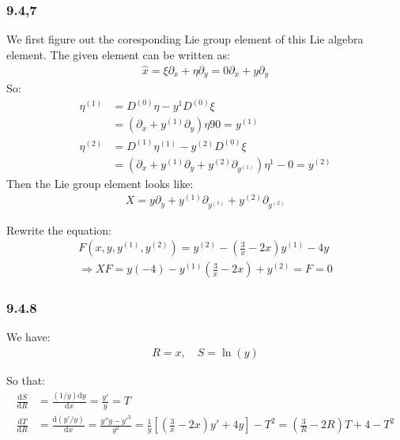 \documentclass[]{ctexart}
\newcommand{\di}{\mathrm{d}}
\newcommand{\pa}{\partial}
\begin{document}
	\subsubsection*{9.4,7}
		We first figure out the coresponding Lie group element of this Lie algebra element. The given element can be written as:
			\begin{equation*}
			\begin{aligned}
				\hat{x}=\xi\pa_x+\eta \pa_y=0\pa_x+y\pa_y
			\end{aligned}
			\end{equation*}
		So:
			\begin{equation*}
			\begin{aligned}
				\eta^{(1)}&=D^{(0)}\eta-y^{1}D^{(0)}\xi\\
				&=(\pa_x+y^{(1)}\pa_y)\eta90=y^{(1)}\\
				\eta^{(2)}&=D^{(1)}\eta^{(1)}-y^{(2)}D^{(0)}\xi\\
				&=(\pa_x+y^{(1)}\pa_y+y^{(2)}\pa_{y^{(1)}})\eta^{1}-0=y^{(2)}
			\end{aligned}
			\end{equation*}
		Then the Lie group element looks like:
			\begin{equation*}
			\begin{aligned}
				X=y\pa_y+y^{(1)}\pa_{y^{(1)}}+y^{(2)}\pa_{y^{(2)}}
			\end{aligned}
			\end{equation*}
			
		Rewrite the equation:
			\begin{equation*}
			\begin{aligned}
				F(x,y,y^{(1)},y^{(2)})=y^{(2)}-\left(\frac{3}{x}-2x\right)y^{(1)}-4y\\
				\Rightarrow XF=y(-4)-y^{(1)}\left(\frac{3}{x}-2x\right)+y^{(2)}=F=0
			\end{aligned}
			\end{equation*}
		
	\subsubsection*{9.4.8}
		We have:
			\begin{equation*}
			\begin{aligned}
				R=x,\quad S=\ln (y)
			\end{aligned}
			\end{equation*}
			
		So that:
			\begin{equation*}
			\begin{aligned}
				\frac{\di S}{\di R}&=\frac{(1/y) \di y}{\di x}=\frac{y'}{y}=T\\
				\frac{\di T}{\di R}&=\frac{\di( y'/y)}{\di x}=\frac{y''y-y'^2}{y^2}=\frac{1}{y}\left[\left(\frac{3}{x}-2x\right)y'+4y\right]-T^2=\left(\frac{3}{R}-2R\right)T+4-T^2
			\end{aligned}
			\end{equation*}
			
\end{document}
